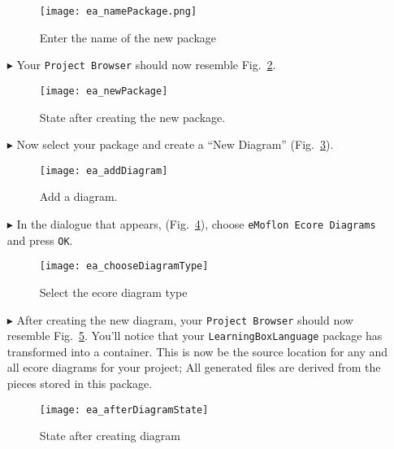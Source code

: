 \begin{itemize}
\begin{figure}[htbp]
	\centering
    \texttt{[image: ea\_namePackage.png]}
	\caption{Enter the name of the new package}
	\label{fig:new_package_name}
\end{figure}
\FloatBarrier

\vspace{1.0cm}

\item[$\blacktriangleright$] Your \texttt{Project Browser} should now resemble Fig.~\ref{fig:new_package_completed}.

\begin{figure}[htbp]
	\centering
  \texttt{[image: ea\_newPackage]}
	\caption{State after creating the new package.}
	\label{fig:new_package_completed}
\end{figure}
\FloatBarrier

\clearpage
\item[$\blacktriangleright$] Now select your package and create a ``New Diagram'' (Fig.~\ref{fig:diagram}).

\begin{figure}[htbp]
	\centering
  \texttt{[image: ea\_addDiagram]}
	\caption{Add a diagram.}
	\label{fig:diagram}
\end{figure}
\FloatBarrier

\item[$\blacktriangleright$] In the dialogue that appears, (Fig.~\ref{fig:diagram_type}), choose \texttt{eMoflon Ecore Diagrams} and press \texttt{OK}. 

\begin{figure}[htbp]
	\centering
  \texttt{[image: ea\_chooseDiagramType]}
	\caption{Select the ecore diagram type}
	\label{fig:diagram_type}
\end{figure}
\FloatBarrier

 
\item[$\blacktriangleright$] After creating the new diagram, your  \texttt{Project Browser} should now resemble Fig.~\ref{fig:diagram_completed}. You'll notice
that your \texttt{LearningBoxLanguage} package has transformed into a container. This is now be the source location for any and all ecore diagrams for your
project; All generated files are derived from the pieces stored in this package.

\begin{figure}[htbp]
	\centering
  \texttt{[image: ea\_afterDiagramState]}
	\caption{State after creating diagram}
	\label{fig:diagram_completed}
\end{figure}
\FloatBarrier


\end{itemize}
